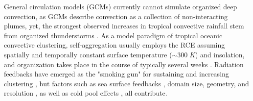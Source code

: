 \documentclass[draft,linenumbers]{agujournal2019}
\begin{document}

\noindent
General circulation models (GCMs) currently cannot simulate organized deep convection, as GCMs describe convection as a collection of non-interacting plumes, yet, the strongest observed increases in tropical convective rainfall stem from organized thunderstorms \cite{tan2015increases}. 
As a model paradigm of tropical oceanic convective clustering, self-aggregation
usually employs the RCE \cite{held1993radiative,tompkins1998radiative} assuming spatially and temporally constant surface temperature ($\sim 300\;K$) and insolation, and organization takes place in the course of typically several weeks \cite{bretherton2005energy,khairoutdinov2010aggregation,muller2012detailed,wing2017convective}. 
Radiation feedbacks have emerged as the "smoking gun" for sustaining and increasing clustering \cite{bretherton2005energy}, but factors such as sea surface feedbacks \cite{hohenegger2016coupled}, domain size, geometry, and resolution \cite{muller2015favors}, as well as cold pool effects \cite{jeevanjee2013convective,haerter2019convective}, all contribute.
\end{document}
